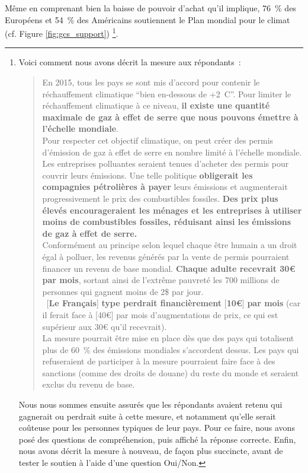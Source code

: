 \documentclass[a5paper,french]{memoir}
\begin{document}
Même en comprenant bien la baisse de pouvoir d'achat qu'il implique, 76~\% des Européens et 54~\% des Américains soutiennent le Plan mondial pour le climat (cf. Figure \ref{fig:gcs_support})
\footnote{
Voici comment nous avons décrit la mesure aux répondants~:
\begin{quote}
En 2015, tous les pays se sont mis d'accord pour contenir le réchauffement climatique ``bien en-dessous de +2~\textdegree{}C''. Pour limiter le réchauffement climatique à ce niveau, \textbf{il existe une quantité maximale de gaz à effet de serre que nous pouvons émettre à l'échelle mondiale}. \\
Pour respecter cet objectif climatique, on peut créer des permis d'émission de gaz à effet de serre en nombre limité à l'échelle mondiale. Les entreprises polluantes seraient tenues d'acheter des permis pour couvrir leurs émissions. Une telle politique \textbf{obligerait les compagnies pétrolières à payer} leurs émissions et augmenterait progressivement le prix des combustibles fossiles. \textbf{Des prix plus élevés encourageraient les ménages et les entreprises à utiliser moins de combustibles fossiles, réduisant ainsi les émissions de gaz à effet de serre.} \\
Conformément au principe selon lequel chaque être humain a un droit égal à polluer, les revenus générés par la vente de permis pourraient financer un revenu de base mondial. \textbf{Chaque adulte recevrait 30\euro{} par mois}, sortant ainsi de l'extrême pauvreté les 700 millions de personnes qui gagnent moins de 2\$ par jour. \\
~[\textbf{Le Français}]\textbf{ type perdrait financièrement }[\textbf{10\euro{}}]\textbf{ par mois}\footnotemark{} 
(car il ferait face à [40\euro{}] par mois d'augmentations de prix, ce qui est supérieur aux 30\euro{} qu'il recevrait). \\
La mesure pourrait être mise en place dès que des pays qui totalisent plus de 60~\% des émissions mondiales s'accordent dessus. Les pays qui refuseraient de participer à la mesure pourraient faire face à des sanctions (comme des droits de douane) du reste du monde et seraient exclus du revenu de base.
\end{quote}
Nous nous sommes ensuite assurés que les répondants avaient retenu qui gagnerait ou perdrait suite à cette mesure, et notamment qu'elle serait coûteuse pour les personnes typiques de leur pays. Pour ce faire, nous avons posé des questions de compréhension, puis affiché la réponse correcte. Enfin, nous avons décrit la mesure à nouveau, de façon plus succincte, avant de tester le soutien à l'aide d'une question Oui/Non.}. 
\end{document}
